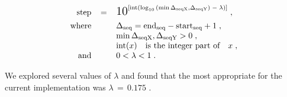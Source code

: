 \documentclass[11pt]{article}
\begin{document}
\[
\begin{array}{rcl}
\mbox{step} & = &
 \mbox{\Large 10}^{
  \left[
    \mathrm{int}( 
      \log_{10}{( \min{ \Delta_{\mathrm{seqX}} , \Delta_{\mathrm{seqY}} )} }
      \;-\; \lambda
    )
  \right]
 } \;, \\[1ex]
\mbox{where} & \quad &
             \Delta_{\mathrm{seq}} = \mathrm{end}_{\mathrm{seq}}
                                   - \mathrm{start}_{\mathrm{seq}} + 1 \;,\\
             & \quad &
             \min{ \Delta_{\mathrm{seqX}} , \Delta_{\mathrm{seqY}} } > 0 \;,\\
             & \quad &
             \mathrm{int}(x) \quad \mbox{is the integer part of} \quad x \;,\\
\mbox{and}   & \quad & 0 < \lambda < 1 \;. \\
\end{array}
\]

We explored several values of $\lambda$ and found that the most appropriate for the current implementation was $\lambda\,=\,0.175$ .
\end{document}
